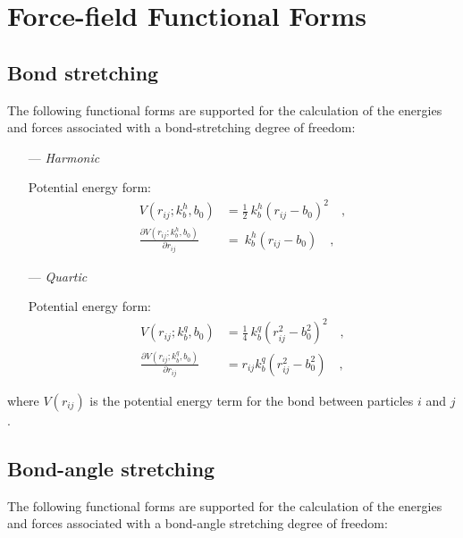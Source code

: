 \documentclass[10pt,a4paper,openany]{memoir}
\numberwithin{equation}{section}
\begin{document}
\section{Force-field Functional Forms}
\label{sec:mm-force-field-functional-forms}


\subsection{Bond stretching}
\label{sec:bond-terms}

The following functional forms are supported for the calculation of
the energies and forces associated with a bond-stretching degree of freedom:\cite{GROMOS-doc,GROMACS-doc}

\begin{itemize}
\item [---] \textit{Harmonic}
  \par
  Potential energy form:
  \begin{align}
    \label{eq:harmonic-bond-energy}
    V(r_{ij}; k_b^h, b_0) & = \frac{1}{2} \ k_b^h (r_{ij} - b_0)^2 \quad , \\ \nonumber
    \frac{\partial V(r_{ij}; k_b^h, b_0)}{\partial r_{ij}} & = \ k_b^h (r_{ij} - b_0) \quad ,
  \end{align}
  
\item [---] \textit{Quartic}
  \par
  Potential energy form:
  \begin{align}
    \label{eq:quartic-bond-energy}
    V(r_{ij}; k_b^q, b_0) & = \frac{1}{4} \ k_b^q (r_{ij}^2 - b_0^2)^2 \quad , \\ \nonumber
    \frac{\partial V(r_{ij}; k_b^q, b_0)}{\partial r_{ij}} & = r_{ij} k_b^q (r_{ij}^2 - b_0^2) \quad ,
  \end{align}

\end{itemize}

\noindent
where $V(r_{ij})$ is the potential energy term for the bond between particles $i$ and $j$.

\subsection{Bond-angle stretching}
\label{sec:angle-terms}

The following functional forms are supported for the calculation of
the energies and forces associated with a bond-angle stretching degree of freedom:\cite{GROMOS-doc,GROMACS-doc}
\end{document}
